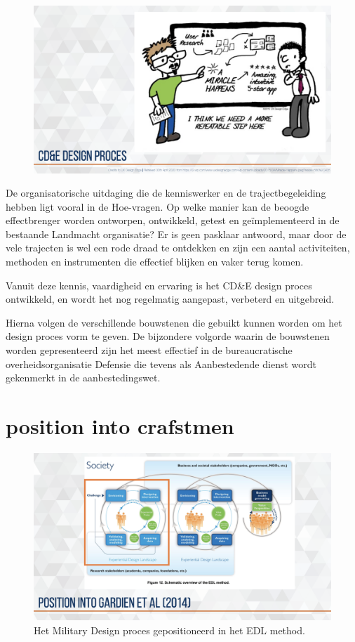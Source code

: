 \documentclass[
]{book}
\begin{document}
\begin{figure}

{\centering \includegraphics[width=0.5\linewidth]{data/keynote-slides/20200430-CDE-Designprocess/20200430-CDE-Designprocess.018} 

}

\caption{ }\label{fig:unnamed-chunk-14}
\end{figure}

De organisatorische uitdaging die de kenniswerker en de trajectbegeleiding hebben ligt vooral in de Hoe-vragen. Op welke manier kan de beoogde effectbrenger worden ontworpen, ontwikkeld, getest en geïmplementeerd in de bestaande Landmacht organisatie? Er is geen pasklaar antwoord, maar door de vele trajecten is wel een rode draad te ontdekken en zijn een aantal activiteiten, methoden en instrumenten die effectief blijken en vaker terug komen.

Vanuit deze kennis, vaardigheid en ervaring is het CD\&E design proces ontwikkeld, en wordt het nog regelmatig aangepast, verbeterd en uitgebreid.

Hierna volgen de verschillende bouwstenen die gebuikt kunnen worden om het design proces vorm te geven. De bijzondere volgorde waarin de bouwstenen worden gepresenteerd zijn het meest effectief in de bureaucratische overheidsorganisatie Defensie die tevens als Aanbestedende dienst wordt gekenmerkt in de aanbestedingswet.

\hypertarget{position-into-crafstmen}{%
\section{position into crafstmen}\label{position-into-crafstmen}}

\begin{figure}

{\centering \includegraphics[width=0.5\linewidth]{data/keynote-slides/20200430-CDE-Designprocess/20200430-CDE-Designprocess.019} 

}

\caption{Het Military Design proces gepositioneerd in het EDL method.}\label{fig:unnamed-chunk-15}
\end{figure}
\end{document}
